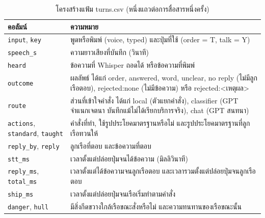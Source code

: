 \begin{table}[!htbp]
\centering
\caption{โครงสร้างแฟ้ม turns.csv (หนึ่งแถวต่อการสื่อสารหนึ่งครั้ง)}
\label{tab:data_turns}
\begin{tabular}{|L{4.90cm}|L{8.80cm}|}
\hline
\textbf{คอลัมน์} & \textbf{ความหมาย} \\
\hline
\texttt{input}, \texttt{key} & พูดหรือพิมพ์ (voice, typed) และปุ่มที่ใช้ (order = T, talk = Y) \\ \hline
\texttt{speech\_s} & ความยาวเสียงที่บันทึก (วินาที) \\ \hline
\texttt{heard} & ข้อความที่ Whisper ถอดได้ หรือข้อความที่พิมพ์ \\ \hline
\texttt{outcome} & ผลลัพธ์ ได้แก่ order, answered, word, unclear, no reply (ไม่มีลูกเรือตอบ), rejected:none (ไม่มีข้อความ) หรือ rejected:<เหตุผล> \\ \hline
\texttt{route} & ส่วนที่เข้าใจคำสั่ง ได้แก่ local (ตัวแยกคำสั่ง), classifier (GPT จำแนกเจตนา บันทึกแม้ไม่ได้เรียกบริการจริง), chat (GPT สนทนา) \\ \hline
\texttt{actions}, \texttt{standard}, \texttt{taught} & คำสั่งที่ทำ, ใช้รูปประโยคมาตรฐานหรือไม่ และรูปประโยคมาตรฐานที่ลูกเรือทวนให้ \\ \hline
\texttt{reply\_by}, \texttt{reply} & ลูกเรือที่ตอบ และข้อความที่ตอบ \\ \hline
\texttt{stt\_ms} & เวลาตั้งแต่ปล่อยปุ่มจนได้ข้อความ (มิลลิวินาที) \\ \hline
\texttt{reply\_ms}, \texttt{total\_ms} & เวลาตั้งแต่ได้ข้อความจนลูกเรือตอบ และเวลารวมตั้งแต่ปล่อยปุ่มจนลูกเรือตอบ \\ \hline
\texttt{ship\_ms} & เวลาตั้งแต่ปล่อยปุ่มจนเรือเริ่มทำตามคำสั่ง \\ \hline
\texttt{danger}, \texttt{hull} & มีสิ่งกีดขวางใกล้เรือขณะสั่งหรือไม่ และความทนทานของเรือขณะนั้น \\
\hline
\end{tabular}
\end{table}

